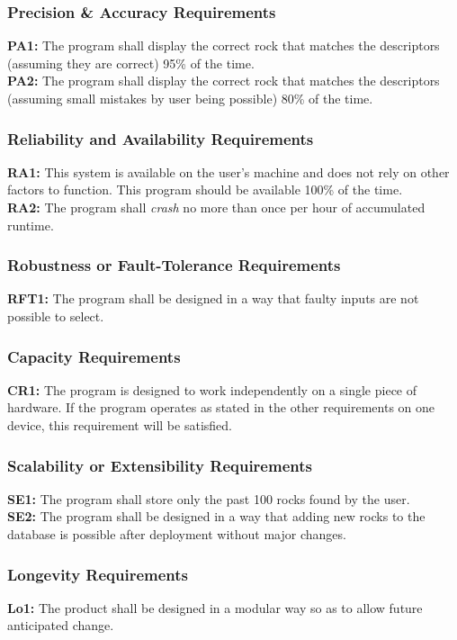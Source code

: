 \documentclass[titlepage]{article}
\begin{document}
\subsubsection{Precision \& Accuracy Requirements}
\textbf{PA1:} The program shall display the correct rock that matches the descriptors (assuming they are correct) 95\% of the time.\\

\noindent\textbf{PA2:} The program shall display the correct rock that matches the descriptors (assuming small mistakes by user being possible) 80\% of the time.
\subsubsection{Reliability and Availability Requirements}
\textbf{RA1:} This system is available on the user's machine and does not rely on other factors to function. This program should be available 100\% of the time.\\

\noindent\textbf{RA2:} The program shall \textit{crash} no more than once per hour of accumulated runtime.
\subsubsection{Robustness or Fault-Tolerance Requirements}
\textbf{RFT1:} The program shall be designed in a way that faulty inputs are not possible to select.
\subsubsection{Capacity Requirements}
\textbf{CR1:} The program is designed to work independently on a single piece of hardware. If the program operates as stated in the other requirements on one device, this requirement will be satisfied.
\subsubsection{Scalability or Extensibility Requirements}
\textbf{SE1:} The program shall store only the past 100 rocks found by the user.\\

\noindent\textbf{SE2:} The program shall be designed in a way that adding new rocks to the database is possible after deployment without major changes.
\subsubsection{Longevity Requirements}
\textbf{Lo1:} The product shall be designed in a modular way so as to allow future anticipated change.
\end{document}
